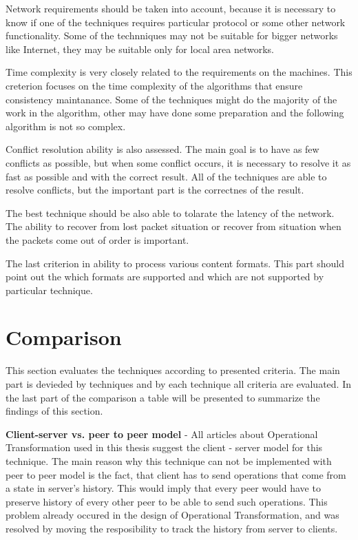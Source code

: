 \documentclass[12pt,oneside]{fithesis2}
\begin{document}
\par Network requirements should be taken into account, because it is necessary to know if one of the techniques requires particular protocol or some other network functionality. Some of the technniques may not be suitable for bigger networks like Internet, they may be suitable only for local area networks.
\par Time complexity is very closely related to the requirements on the machines. This creterion focuses on the time complexity of the algorithms that ensure consistency maintanance. Some of the techniques might do the majority of the work in the algorithm, other may have done some preparation and the following algorithm is not so complex.
\par Conflict resolution ability is also assessed. The main goal is to have as few conflicts as possible, but when some conflict occurs, it is necessary to resolve it as fast as possible and with the correct result. All of the techniques are able to resolve conflicts, but the important part is the correctnes of the result. 
\par The best technique should be also able to tolarate the latency of the network. The ability to recover from lost packet situation or recover from situation when the packets come out of order is important. 
\par The last criterion in ability to process various content formats. This part should point out the which formats are supported and which are not supported by particular technique.
\section{Comparison}
\par This section evaluates the techniques according to presented criteria. The main part is devieded by techniques and by each technique all criteria are evaluated. In the last part of the comparison a table will be presented to summarize the findings of this section.
\\
\par \textbf{\underline{}}

\vspace{3mm}

\textbf{Client-server vs. peer to peer model} - All articles about Operational Transformation used in this thesis suggest the client - server model for this technique. The main reason why this technique can not be implemented with peer to peer model is the fact, that client has to send operations that come from a state in server's history. This would imply that every peer would have to preserve history of every other peer to be able to send such operations. This problem already occured in the design of Operational Transformation, and was resolved by moving the resposibility to track the history from server to clients.
\end{document}
